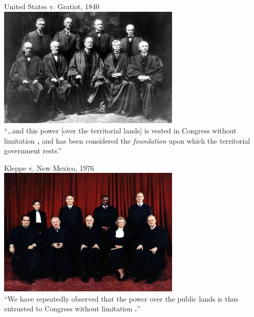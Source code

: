 \begin{frame}{United States v. Gratiot, 1840}
    \centering
    \includegraphics[width=0.65\textwidth]{img/sc-1905.png} \\
    ``\ldots and this power [over the territorial lands] is vested in Congress
    without limitation {\huge\color{red} \textbf{,}} and has been considered the \emph{foundation} upon which the
    territorial government rests.''
\end{frame}

\begin{frame}{Kleppe v. New Mexico, 1976}
    \centering
    \includegraphics[width=0.65\textwidth]{img/sc-1976.png} \\
    ``We have repeatedly observed that the power over the public lands is thus entrusted to Congress without limitation{ \huge \color{red} \textbf{.}}''
\end{frame}

